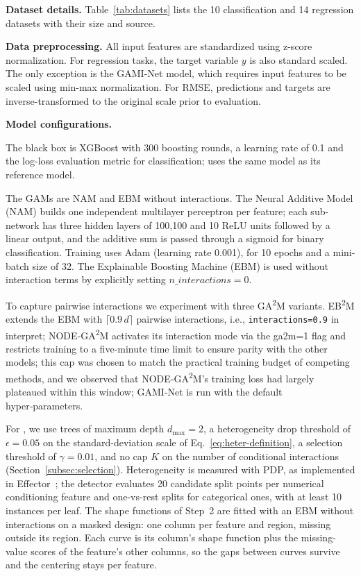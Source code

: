 \textbf{Dataset details.}
Table~\ref{tab:datasets} lists the 10 classification and 14 regression datasets with their size and source.

\textbf{Data preprocessing.}
All input features are standardized using z-score normalization. For regression tasks, the target variable $y$ is also standard scaled. The only exception is the GAMI-Net model, which requires input features to be scaled using min-max normalization.
For RMSE, predictions and targets are inverse-transformed to the original scale prior to evaluation.

\textbf{Model configurations.}

The black box is XGBoost with 300 boosting rounds, a learning rate of 0.1 and the log-loss evaluation metric for classification; \method{} uses the same model as its reference model.

The GAMs are NAM and EBM without interactions. The Neural Additive Model (NAM) builds one independent multilayer perceptron per feature; each sub-network has three hidden layers of 100,100 and 10 ReLU units followed by a linear output, and the additive sum is passed through a sigmoid for binary classification. Training uses Adam (learning rate 0.001), for 10 epochs and a mini-batch size of 32. The Explainable Boosting Machine (EBM) is used without interaction terms by explicitly setting $n\_interactions=0$.

To capture pairwise interactions we experiment with three GA\textsuperscript{2}M variants. EB\textsuperscript{2}M extends the EBM with $\lceil 0.9\,d\rceil$ pairwise interactions, i.e., \texttt{interactions=0.9} in interpret; NODE‑GA\textsuperscript{2}M activates its interaction mode via the ga2m=1 flag and restricts training to a five‑minute time limit to ensure parity with the other models; this cap was chosen to match the practical training budget of competing methods, and we observed that NODE‑GA\textsuperscript{2}M's training loss had largely plateaued within this window; GAMI‑Net is run with the default hyper‑parameters.

For \method{}, we use trees of maximum depth $d_{\max} = 2$, a heterogeneity drop threshold of $\epsilon = 0.05$ on the standard-deviation scale of Eq.~\eqref{eq:heter-definition}, a selection threshold of $\gamma = 0.01$, and no cap $K$ on the number of conditional interactions (Section~\ref{subsec:selection}). Heterogeneity is measured with PDP, as implemented in Effector~\cite{gkolemis2024effector}; the detector evaluates 20 candidate split points per numerical conditioning feature and one-vs-rest splits for categorical ones, with at least 10 instances per leaf. The shape functions of Step~2 are fitted with an EBM without interactions on a masked design: one column per feature and region, missing outside its region. Each curve is its column's shape function plus the missing-value scores of the feature's other columns, so the gaps between curves survive and the centering stays per feature.

